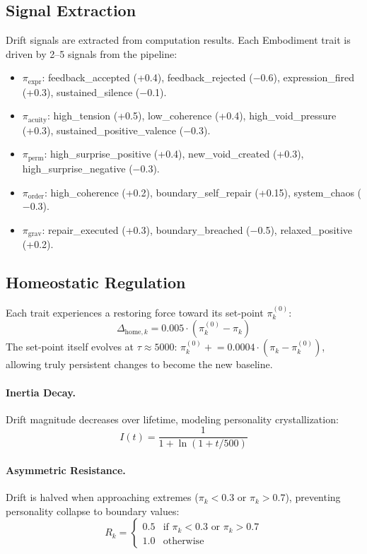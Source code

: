 \documentclass[11pt]{article}
\begin{document}
\subsection{Signal Extraction}

Drift signals are extracted from computation results. Each Embodiment trait is driven by 2--5 signals from the pipeline:
\begin{itemize}[leftmargin=*]
\item $\pi_{\text{expr}}$: feedback\_accepted (+0.4), feedback\_rejected ($-$0.6), expression\_fired (+0.3), sustained\_silence ($-$0.1).
\item $\pi_{\text{acuity}}$: high\_tension (+0.5), low\_coherence (+0.4), high\_void\_pressure (+0.3), sustained\_positive\_valence ($-$0.3).
\item $\pi_{\text{perm}}$: high\_surprise\_positive (+0.4), new\_void\_created (+0.3), high\_surprise\_negative ($-$0.3).
\item $\pi_{\text{order}}$: high\_coherence (+0.2), boundary\_self\_repair (+0.15), system\_chaos ($-$0.3).
\item $\pi_{\text{grav}}$: repair\_executed (+0.3), boundary\_breached ($-$0.5), relaxed\_positive (+0.2).
\end{itemize}

\subsection{Homeostatic Regulation}

Each trait experiences a restoring force toward its set-point $\pi_k^{(0)}$:
\begin{equation}
\Delta_{\text{home},k} = 0.005 \cdot (\pi_k^{(0)} - \pi_k)
\end{equation}
The set-point itself evolves at $\tau \approx 5000$: $\pi_k^{(0)} \mathrel{+}= 0.0004 \cdot (\pi_k - \pi_k^{(0)})$, allowing truly persistent changes to become the new baseline.

\paragraph{Inertia Decay.}
Drift magnitude decreases over lifetime, modeling personality crystallization:
\begin{equation}
I(t) = \frac{1}{1 + \ln(1 + t/500)}
\end{equation}

\paragraph{Asymmetric Resistance.}
Drift is halved when approaching extremes ($\pi_k < 0.3$ or $\pi_k > 0.7$), preventing personality collapse to boundary values:
\begin{equation}
R_k = \begin{cases} 0.5 & \text{if } \pi_k < 0.3 \text{ or } \pi_k > 0.7 \\ 1.0 & \text{otherwise} \end{cases}
\end{equation}
\end{document}
